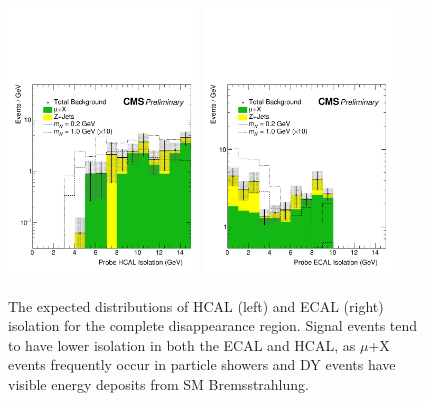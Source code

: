 \begin{figure}[htbp]
	\centering
	\includegraphics[width=0.45\textwidth]{figures/totDisappHcalIso.pdf}
	\hspace{0.01\textwidth}
	\includegraphics[width=0.45\textwidth]{figures/totDisappEcalIso.pdf}
	\caption[Expected Complete Disappearance Isolation]{The expected distributions of HCAL (left) and ECAL (right) isolation for the complete disappearance region. Signal events tend to have lower isolation in both the ECAL and HCAL, as $\mu$+X events frequently occur in particle showers and DY events have visible energy deposits from SM Bremsstrahlung.}
	\label{fig:totHcalIso}
\end{figure}

